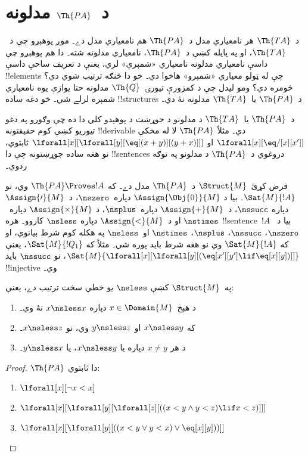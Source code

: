 \documentclass[../../../include/open-logic-section]{subfiles}
\begin{document}
\section{د~$\Th{PA}$ مدلونه}

\begin{explain}
د~$\Th{TA}$ هر نامعياري مدل د~$\Th{PA}$ هم نامعياري مدل دے۔ موږ
پوهېږو چې د~$\Th{TA}$، او په پايله کښې د~$\Th{PA}$، نامعياري
مدلونه شته۔ دا هم پوهېږو چې داسې نامعياري مدلونه نامعياري «شمېرې»
لري، يعنې د تعريف ساحې داسې !!{element}s چې له ټولو معياري «شمېرو»
هاخوا دي۔ خو دا څنګه ترتيب شوي دي؟ څومره دي؟ ومو ليدل چې د کمزورې
تيورۍ~$\Th{Q}$ مدلونه حتا يوازې يوه نامعياري شمېره لرلے شي۔ خو دغه
ساده !!{structure}s د~$\Th{PA}$ يا~$\Th{TA}$ مدلونه نۀ دي۔

د~$\Th{PA}$ يا~$\Th{TA}$ د مدلونو د جوړښت د پوهېدو کلي دا ده چې
وګورو په دغو تيوريو کښې کوم حقيقتونه !!{derivable} دي۔ مثلاً
$\Th{PA}$ لا له مخکې
$\lforall[x][\eq/[x][x']]$ او
$\lforall[x][\lforall[y][\eq[(x+y)][(y+x)]]]$ ثابتوي، نو هغه ساده
جوړښتونه چې دا !!{sentence}s دروغوي د~$\Th{PA}$ د مدلونو په توګه
ردوي۔

فرض کړئ~$\Struct{M}$ د~$\Th{PA}$ مدل دے۔ که
$\Th{PA} \Proves !A$ وي، نو $\Sat{M}{!A}$۔ بيا د
$\Assign{\Obj{0}}{M}$ دپاره~$\nszero$، د~$\Assign{\prime}{M}$ دپاره
$\nssucc$، د~$\Assign{+}{M}$ دپاره~$\nsplus$، د
$\Assign{\times}{M}$ دپاره~$\nstimes$ او د~$\Assign{<}{M}$ دپاره
$\nsless$ کاروو۔ هره !!{sentence}~$!A$ بيا د~$\nszero$، $\nssucc$،
$\nsplus$، $\nstimes$ او~$\nsless$ په هکله کوم شرط بيانوي، او که
$\Sat{M}{!A}$ وي نو هغه شرط بايد پوره شي۔ مثلاً که
$\Sat{M}{!Q_1}$، يعنې
$\Sat{M}{\lforall[x][\lforall[y][(\eq[x'][y'] \lif \eq[x][y])]]}$،
نو $\nssucc$ بايد !!{injective} وي۔
\end{explain}

\begin{prop}
په~$\Struct{M}$ کښې $\nsless$ يو خطي سخت ترتيب دے، يعنې:
\begin{enumerate}
\item د هېڅ~$x \in \Domain{M}$ دپاره $x \nsless x$ نۀ وي۔
\item که $x \nsless y$ او $y \nsless z$ وي، نو $x \nsless z$۔
\item د هر $x\neq y$ دپاره يا $x\nsless y$، يا $y\nsless x$۔
\end{enumerate}
\end{prop}

\begin{proof}
$\Th{PA}$ دا ثابتوي:
\begin{enumerate}
\item $\lforall[x][\lnot x < x]$
\item $\lforall[x][\lforall[y][\lforall[z][((x < y \land y < z) \lif x < z)]]]$
\item $\lforall[x][\lforall[y][((x < y \lor y < x) \lor \eq[x][y]))]]$
\end{enumerate}
\end{proof}
\end{document}
